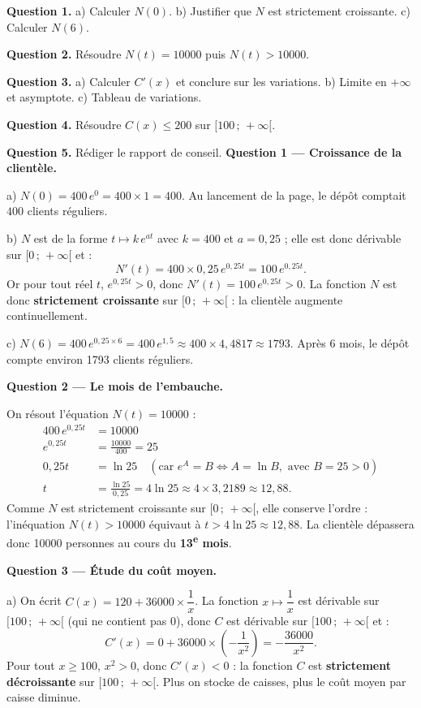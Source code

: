\documentclass[11pt]{article}
\begin{document}
\begin{exoresolu}
\textbf{Question 1.} a) Calculer $N(0)$. b) Justifier que $N$ est strictement croissante. c) Calculer $N(6)$.

\textbf{Question 2.} Résoudre $N(t) = \num{10000}$ puis $N(t) > \num{10000}$.

\textbf{Question 3.} a) Calculer $C'(x)$ et conclure sur les variations. b) Limite en $+\infty$ et asymptote. c) Tableau de variations.

\textbf{Question 4.} Résoudre $C(x) \leq 200$ sur $[100\,;\,+\infty[$.

\textbf{Question 5.} Rédiger le rapport de conseil.
\tcblower
\textbf{Question 1 — Croissance de la clientèle.}

a) $N(0) = 400\,e^{0} = 400 \times 1 = 400$. Au lancement de la page, le dépôt comptait $400$ clients réguliers.

b) $N$ est de la forme $t \mapsto k\,e^{at}$ avec $k = 400$ et $a = 0{,}25$ ; elle est donc dérivable sur $[0\,;\,+\infty[$ et :
\[ N'(t) = 400 \times 0{,}25\,e^{0{,}25t} = 100\,e^{0{,}25t}. \]
Or pour tout réel $t$, $e^{0{,}25t} > 0$, donc $N'(t) = 100\,e^{0{,}25t} > 0$. La fonction $N$ est donc \textbf{strictement croissante} sur $[0\,;\,+\infty[$ : la clientèle augmente continuellement.

c) $N(6) = 400\,e^{0{,}25 \times 6} = 400\,e^{1{,}5} \approx 400 \times 4{,}4817 \approx \num{1793}$. Après $6$ mois, le dépôt compte environ \num{1793} clients réguliers.

\textbf{Question 2 — Le mois de l'embauche.}

On résout l'équation $N(t) = \num{10000}$ :
\begin{align*}
400\,e^{0{,}25t} &= \num{10000}\\
e^{0{,}25t} &= \frac{\num{10000}}{400} = 25\\
0{,}25t &= \ln 25 \quad (\text{car } e^{A} = B \iff A = \ln B, \text{ avec } B = 25 > 0)\\
t &= \frac{\ln 25}{0{,}25} = 4\ln 25 \approx 4 \times 3{,}2189 \approx 12{,}88.
\end{align*}
Comme $N$ est strictement croissante sur $[0\,;\,+\infty[$, elle conserve l'ordre : l'inéquation $N(t) > \num{10000}$ équivaut à $t > 4\ln 25 \approx 12{,}88$. La clientèle dépassera donc \num{10000} personnes au cours du \textbf{13\textsuperscript{e} mois}.

\textbf{Question 3 — Étude du coût moyen.}

a) On écrit $C(x) = 120 + 36000 \times \dfrac{1}{x}$. La fonction $x \mapsto \dfrac{1}{x}$ est dérivable sur $[100\,;\,+\infty[$ (qui ne contient pas $0$), donc $C$ est dérivable sur $[100\,;\,+\infty[$ et :
\[ C'(x) = 0 + 36000 \times \left(-\frac{1}{x^2}\right) = -\frac{36000}{x^2}. \]
Pour tout $x \geq 100$, $x^2 > 0$, donc $C'(x) < 0$ : la fonction $C$ est \textbf{strictement décroissante} sur $[100\,;\,+\infty[$. Plus on stocke de caisses, plus le coût moyen par caisse diminue.


\end{exoresolu}
\end{document}
